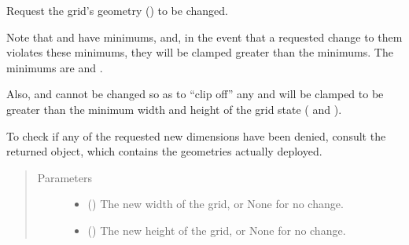 \documentclass[letterpaper,10pt,english,openany,oneside]{sphinxmanual}
\begin{document}
\begin{fulllineitems}
\begin{fulllineitems}
\begin{description}
\begin{itemize}
\end{itemize}

\end{description}

\end{fulllineitems}


\begin{fulllineitems}
\label{\detokenize{api:spookyconsole.gui.core.Grid.set_geometry}}
Request the grid’s geometry () to be changed.

Note that  and  have minimums, and, in the event that a requested change to them
violates these minimums, they will be clamped greater than the minimums. The minimums are
 and .

Also,  and  cannot be changed so as to “clip off” any  and  will be clamped to be greater than the minimum width and
height of the grid state ( and ).

To check if any of the requested new dimensions have been denied, consult the returned  object,
which contains the geometries actually deployed.
\begin{quote}\begin{description}
\item[{Parameters}] \leavevmode\begin{itemize}
\item {} 
 () \textendash{} The new width of the grid, or None for no change.

\item {} 
 () \textendash{} The new height of the grid, or None for no change.


\end{itemize}
\end{description}
\end{quote}
\end{fulllineitems}
\end{fulllineitems}
\end{document}
